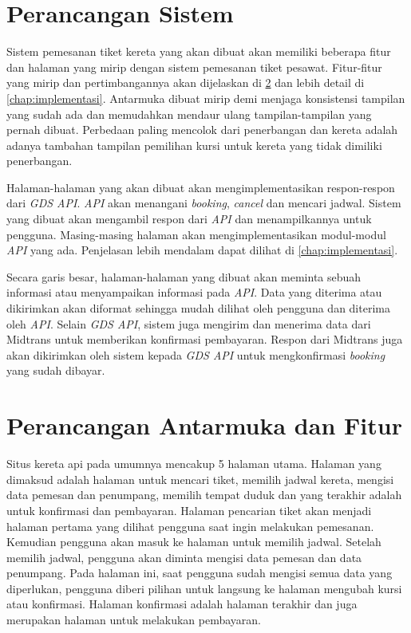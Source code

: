 \section{Perancangan Sistem}
\label{sec:perancangansistem}
Sistem pemesanan tiket kereta yang akan dibuat akan memiliki beberapa fitur dan halaman yang mirip dengan sistem pemesanan tiket pesawat. Fitur-fitur yang mirip dan pertimbangannya akan dijelaskan di \ref{sec:perancanganhalaman} dan lebih detail di \ref{chap:implementasi}. Antarmuka dibuat mirip demi menjaga konsistensi tampilan yang sudah ada dan memudahkan mendaur ulang tampilan-tampilan yang pernah dibuat. Perbedaan paling mencolok dari penerbangan dan kereta adalah adanya tambahan tampilan pemilihan kursi untuk kereta yang tidak dimiliki penerbangan.

Halaman-halaman yang akan dibuat akan mengimplementasikan respon-respon dari \textit{GDS API}. \textit{API} akan menangani \textit{booking}, \textit{cancel} dan mencari jadwal. Sistem yang dibuat akan mengambil respon dari \textit{API} dan menampilkannya untuk pengguna. Masing-masing halaman akan mengimplementasikan modul-modul \textit{API} yang ada. Penjelasan lebih mendalam dapat dilihat di \ref{chap:implementasi}.

Secara garis besar, halaman-halaman yang dibuat akan meminta sebuah informasi atau menyampaikan informasi pada \textit{API}. Data yang diterima atau dikirimkan akan diformat sehingga mudah dilihat oleh pengguna dan diterima oleh \textit{API}. Selain \textit{GDS API}, sistem juga mengirim dan menerima data dari Midtrans untuk memberikan konfirmasi pembayaran. Respon dari Midtrans juga akan dikirimkan oleh sistem kepada \textit{GDS API} untuk mengkonfirmasi \textit{booking} yang sudah dibayar.

\section{Perancangan Antarmuka dan Fitur}
\label{sec:perancanganhalaman} 

Situs kereta api pada umumnya mencakup 5 halaman utama. Halaman yang dimaksud adalah halaman untuk mencari tiket, memilih jadwal kereta, mengisi data pemesan dan penumpang, memilih tempat duduk dan yang terakhir adalah untuk konfirmasi dan pembayaran. Halaman pencarian tiket akan menjadi halaman pertama yang dilihat pengguna saat ingin melakukan pemesanan. Kemudian pengguna akan masuk ke halaman untuk memilih jadwal. Setelah memilih jadwal, pengguna akan diminta mengisi data pemesan dan data penumpang. Pada halaman ini, saat pengguna sudah mengisi semua data yang diperlukan, pengguna diberi pilihan untuk langsung ke halaman mengubah kursi atau konfirmasi. Halaman konfirmasi adalah halaman terakhir dan juga merupakan halaman untuk melakukan pembayaran.

